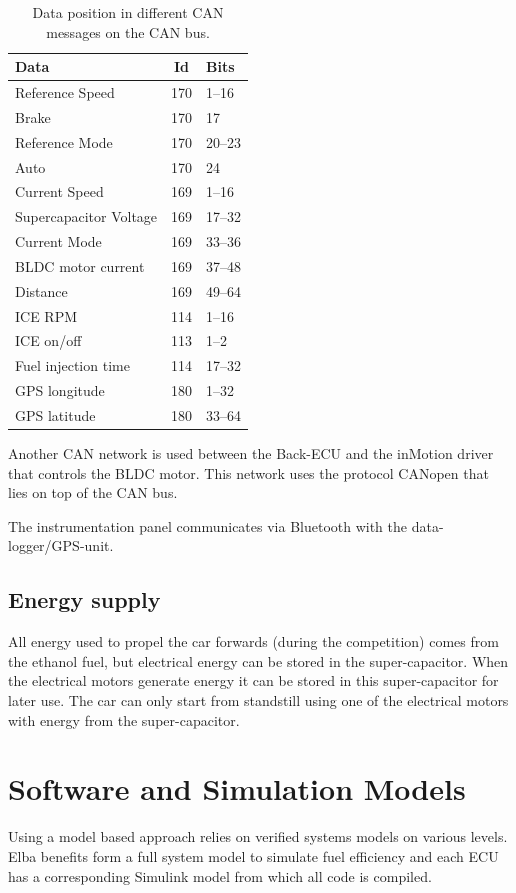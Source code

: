 \begin{table}[H]
\label{table:CAN}
\begin{center}
\begin{tabular}{lcl}
\textbf{Data} & \textbf{Id} & \textbf{Bits}\\
\toprule
Reference Speed & 170 & 1--16 \\
Brake & 170 & 17 \\
Reference Mode & 170 & 20--23 \\
Auto & 170 & 24 \\
Current Speed & 169 & 1--16 \\
Supercapacitor Voltage & 169 & 17--32 \\ 
Current Mode & 169 & 33--36 \\ 
BLDC motor current & 169 & 37--48 \\
Distance & 169 & 49--64 \\
ICE RPM & 114 & 1--16 \\
ICE on/off & 113 & 1--2 \\
Fuel injection time & 114 & 17--32 \\
GPS longitude & 180 & 1--32 \\ 
GPS latitude & 180 & 33--64 \\
\bottomrule
\end{tabular}
\end{center}
\caption{Data position in different CAN messages on the CAN bus.}
\end{table}

Another CAN network is used between the Back-ECU and the inMotion driver that
controls the BLDC motor. This network uses the protocol CANopen that
lies on top of the CAN bus.

The instrumentation panel communicates via Bluetooth with the data-logger/GPS-unit.

\subsection{Energy supply}
All energy used to propel the car forwards (during the competition) comes from
the ethanol fuel, but electrical energy can be stored in the super-capacitor.
When the electrical motors generate energy it can be stored in this
super-capacitor for later use. The car can only start from standstill using one
of the electrical motors with energy from the super-capacitor.  

\section{Software and Simulation Models}
Using a model based approach relies on verified systems models on various
levels. Elba benefits form a full system model to simulate fuel efficiency and
each ECU has a corresponding Simulink model from which all code is compiled.

